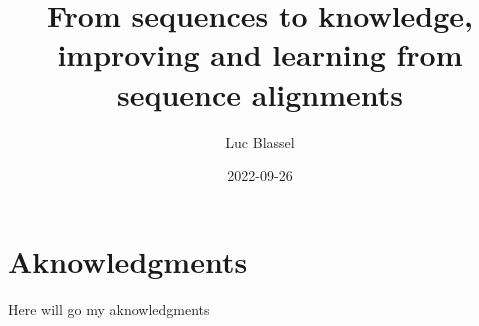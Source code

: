\documentclass[
  11pt,
  twoside,
  BCOR=10mm,
  listof=totoc]{scrbook}
\title{From sequences to knowledge, improving and learning from sequence alignments}
\author{Luc Blassel}
\date{2022-09-26}
\begin{document}
\maketitle




\pagestyle{empty}

\cleardoubleevenpage

\frontmatter

\chapter{Aknowledgments}
Here will go my aknowledgments
\lipsum[7-9]

{
\setcounter{tocdepth}{2}
\tableofcontents
}
\listoffigures
\listoftables
\pagestyle{empty}
\end{document}
